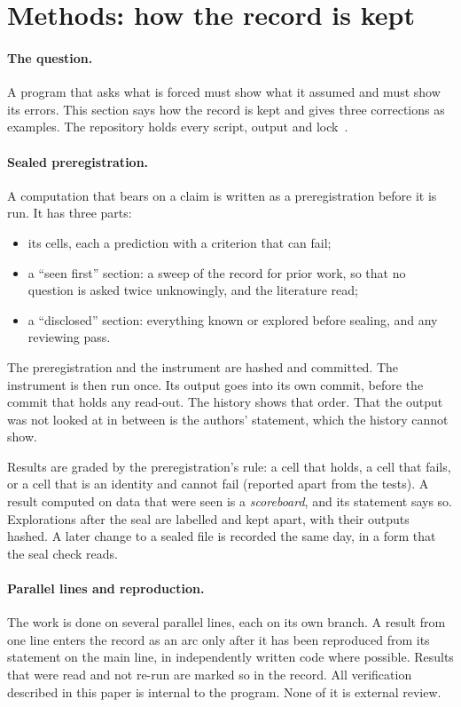 \section{Methods: how the record is kept}\label{sec:methods}

\paragraph{The question.}
A program that asks what is forced must show what it assumed and must show its errors. This section says how the
record is kept and gives three corrections as examples. The repository holds every script, output and
lock~\cite{OriginAxiomRepo}.

\paragraph{Sealed preregistration.}
A computation that bears on a claim is written as a preregistration before it is run. It has three parts:
\begin{itemize}
\item its cells, each a prediction with a criterion that can fail;
\item a ``seen first'' section: a sweep of the record for prior work, so that no question is asked twice unknowingly,
  and the literature read;
\item a ``disclosed'' section: everything known or explored before sealing, and any reviewing pass.
\end{itemize}
The preregistration and the instrument are hashed and committed. The instrument is then run once. Its output goes into
its own commit, before the commit that holds any read-out. The history shows that order. That the output was not
looked at in between is the authors' statement, which the history cannot show.

Results are graded by the preregistration's rule: a cell that holds, a cell that fails, or a cell that is an identity
and cannot fail (reported apart from the tests). A result computed on data that were seen is a \emph{scoreboard}, and
its statement says so. Explorations after the seal are labelled and kept apart, with their outputs hashed. A later
change to a sealed file is recorded the same day, in a form that the seal check reads.

\paragraph{Parallel lines and reproduction.}
The work is done on several parallel lines, each on its own branch. A result from one line enters the record as an arc only
after it has been reproduced from its statement on the main line, in independently written code where possible.
Results that were read and not re-run are marked so in the record.
All verification described in this paper is internal to the program. None of it is external review.

